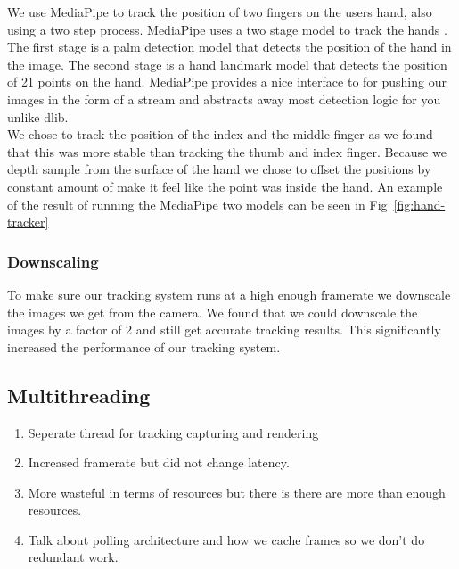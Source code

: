 We use MediaPipe to track the position of two fingers on the users hand, also using a two step process. MediaPipe uses a two stage model to track the hands \tocite. The first stage is a palm detection model that detects the position of the hand in the image. The second stage is a hand landmark model that detects the position of 21 points on the hand. MediaPipe provides a nice interface to for pushing our images in the form of a stream and abstracts away most detection logic for you unlike dlib. \\

We chose to track the position of the index and the middle finger as we found that this was more stable than tracking the thumb and index finger. Because we depth sample from the surface of the hand we chose to offset the positions by constant amount of make it feel like the point was inside the hand. An example of the result of running the MediaPipe two models can be seen in Fig~\ref{fig:hand-tracker} \\

\subsubsection*{Downscaling}
To make sure our tracking system runs at a high enough framerate we downscale the images we get from the camera. We found that we could downscale the images by a factor of 2 and still get accurate tracking results. This significantly increased the performance of our tracking system. 


\subsection{Multithreading}

\begin{enumerate}[itemsep=-0.25em]
	\item Seperate thread for tracking capturing and rendering
	\item Increased framerate but did not change latency.
	\item More wasteful in terms of resources but there is there are more than enough resources.
	\item Talk about polling architecture and how we cache frames so we don't do redundant work.
\end{enumerate}

